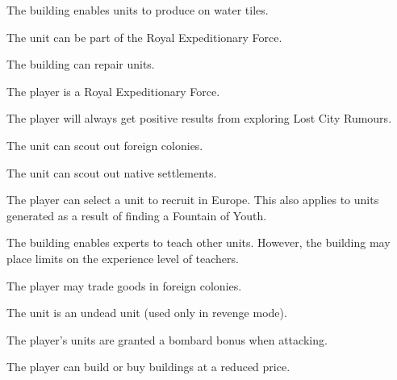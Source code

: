 \documentclass[12pt]{book}
\begin{document}
\affectsBuilding

The building enables units to produce on water tiles.

\affectsUnit

The unit can be part of the Royal Expeditionary Force.

\affectsBuilding

The building can repair units.

\affectsPlayer

The player is a Royal Expeditionary Force.

\affectsPlayer

The player will always get positive results from exploring Lost City
Rumours.

\affectsUnit

The unit can scout out foreign colonies.

\affectsUnit

The unit can scout out native settlements.

\affectsPlayer

The player can select a unit to recruit in Europe. This also applies
to units generated as a result of finding a Fountain of Youth.

\affectsBuilding

The building enables experts to teach other units. However, the
building may place limits on the experience level of teachers.

\affectsPlayer

The player may trade goods in foreign colonies.

\affectsUnit

The unit is an undead unit (used only in revenge mode).





\affectsPlayer

The player's units are granted a bombard bonus when attacking.

\affectsPlayer

The player can build or buy buildings at a reduced price.
\end{document}

